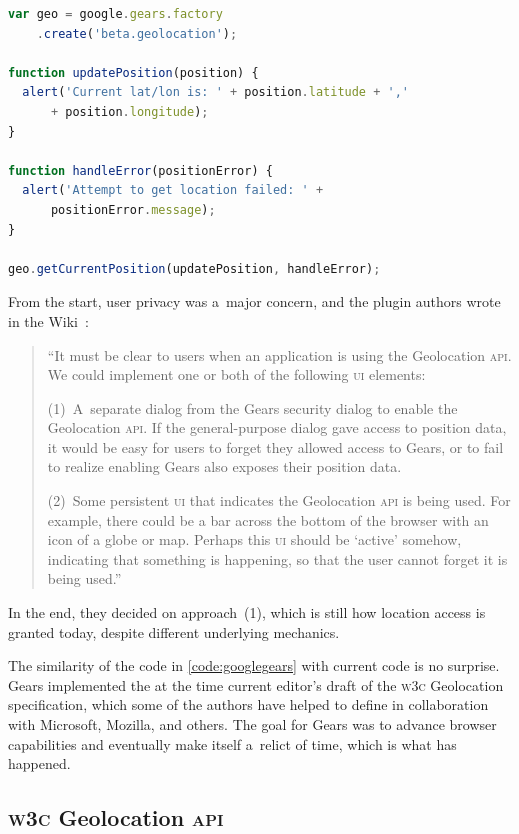 \documentclass[sigconf,hyphens]{acmart}
\begin{document}
\begin{lstlisting}[caption={Google Gears \textsc{api} (2008)},
  label=code:googlegears, language=JavaScript, float=h] 
var geo = google.gears.factory
    .create('beta.geolocation');

function updatePosition(position) {
  alert('Current lat/lon is: ' + position.latitude + ','
      + position.longitude);
}

function handleError(positionError) {
  alert('Attempt to get location failed: ' +
      positionError.message);
}

geo.getCurrentPosition(updatePosition, handleError);
\end{lstlisting} 

From the start, user privacy was a~major concern, and
the plugin authors wrote in the Wiki~\cite{gears2008wiki}:

\begin{quote}
``It must be clear to users when an application is using the Geolocation \textsc{api}.
We could implement one or both of the following \textsc{ui} elements:

(1)~A~separate dialog from the Gears security dialog to enable the Geolocation \textsc{api}.
If the general-purpose dialog gave access to position data,
it would be easy for users to forget they allowed access to Gears,
or to fail to realize enabling Gears also exposes their position data.

(2)~Some persistent \textsc{ui} that indicates the Geolocation \textsc{api} is being used.
For example, there could be a bar across the bottom of the browser with an icon of a globe or map.
Perhaps this \textsc{ui} should be `active' somehow, indicating that something is happening,
so that the user cannot forget it is being used.''
\end{quote}

In the end, they decided on approach~(1), which is still how location access is granted today,
despite different underlying mechanics.

The similarity of the code in \autoref{code:googlegears} with current code is no surprise.
Gears implemented the at the time current editor's draft of the \textsc{w3c} Geolocation specification,
which some of the authors have helped to define in collaboration with Microsoft, Mozilla, and others.
The goal for Gears was to advance browser capabilities and eventually make itself a~relict of time,
which is what has happened.

\subsection{\textsc{w3c} Geolocation \textsc{api}}
\end{document}
